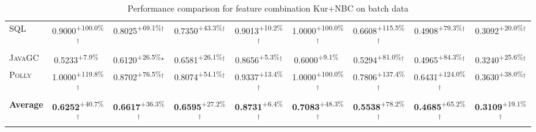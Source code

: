 \begin{table}[htbp]
\begin{tabular}{l|cccc|cccc}
\textsc{SQL} & \cellcolor{green!30}0.9000\textsuperscript{+100.0\%}$^\dagger$ & \cellcolor{green!30}0.8025\textsuperscript{+69.1\%}$^\dagger$ & \cellcolor{green!30}0.7350\textsuperscript{+43.3\%}$^\dagger$ & \cellcolor{green!30}0.9013\textsuperscript{+10.2\%}$^\dagger$ & \cellcolor{green!30}1.0000\textsuperscript{+100.0\%}$^\dagger$ & \cellcolor{green!30}0.6608\textsuperscript{+115.5\%}$^\dagger$ & \cellcolor{green!30}0.4908\textsuperscript{+79.3\%}$^\dagger$ & \cellcolor{green!30}0.3092\textsuperscript{+20.0\%}$^\dagger$ \\
\textsc{JavaGC} & \cellcolor{green!30}0.5233\textsuperscript{+7.9\%}$^{\,\,\,}$ & \cellcolor{green!30}0.6120\textsuperscript{+26.5\%}$^\star$ & \cellcolor{green!30}0.6581\textsuperscript{+26.1\%}$^\dagger$ & \cellcolor{green!30}0.8656\textsuperscript{+5.3\%}$^\dagger$ & \cellcolor{green!30}0.6000\textsuperscript{+9.1\%}$^{\,\,\,}$ & \cellcolor{green!30}0.5294\textsuperscript{+81.0\%}$^\dagger$ & \cellcolor{green!30}0.4965\textsuperscript{+84.3\%}$^\dagger$ & \cellcolor{green!30}0.3240\textsuperscript{+25.6\%}$^\dagger$ \\
\textsc{Polly} & \cellcolor{green!30}1.0000\textsuperscript{+119.8\%}$^\dagger$ & \cellcolor{green!30}0.8702\textsuperscript{+76.5\%}$^\dagger$ & \cellcolor{green!30}0.8074\textsuperscript{+54.1\%}$^\dagger$ & \cellcolor{green!30}0.9337\textsuperscript{+13.4\%}$^\dagger$ & \cellcolor{green!30}1.0000\textsuperscript{+100.0\%}$^\dagger$ & \cellcolor{green!30}0.7806\textsuperscript{+137.4\%}$^\dagger$ & \cellcolor{green!30}0.6431\textsuperscript{+124.0\%}$^\dagger$ & \cellcolor{green!30}0.3630\textsuperscript{+38.0\%}$^\dagger$ \\
\hline
\textbf{Average} & \cellcolor{green!30}\textbf{0.6252}\textsuperscript{+40.7\%}$^\dagger$ & \cellcolor{green!30}\textbf{0.6617}\textsuperscript{+36.3\%}$^\dagger$ & \cellcolor{green!30}\textbf{0.6595}\textsuperscript{+27.2\%}$^\dagger$ & \cellcolor{green!30}\textbf{0.8731}\textsuperscript{+6.4\%}$^\dagger$ & \cellcolor{green!30}\textbf{0.7083}\textsuperscript{+48.3\%}$^\dagger$ & \cellcolor{green!30}\textbf{0.5538}\textsuperscript{+78.2\%}$^\dagger$ & \cellcolor{green!30}\textbf{0.4685}\textsuperscript{+65.2\%}$^\dagger$ & \cellcolor{green!30}\textbf{0.3109}\textsuperscript{+19.1\%}$^\dagger$ \\
\hline
\end{tabular}
\caption{Performance comparison for feature combination Kur+NBC on batch data}
\label{tab:combo_Kur_NBC_performance_batch}
\end{table}